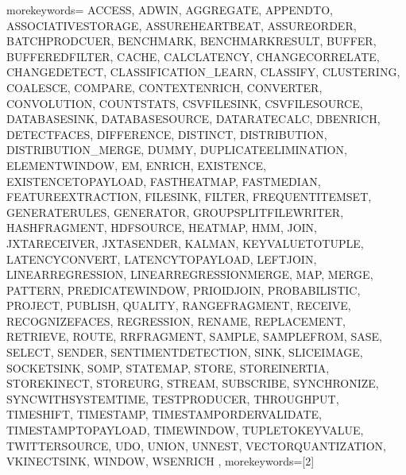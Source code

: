 
%
   {morekeywords={%
ACCESS, ADWIN, AGGREGATE, APPENDTO, ASSOCIATIVESTORAGE, ASSUREHEARTBEAT, ASSUREORDER, BATCHPRODCUER, BENCHMARK, BENCHMARKRESULT, BUFFER, BUFFEREDFILTER, CACHE, CALCLATENCY, CHANGECORRELATE, CHANGEDETECT, CLASSIFICATION_LEARN, CLASSIFY, CLUSTERING, COALESCE, COMPARE, CONTEXTENRICH, CONVERTER, CONVOLUTION, COUNTSTATS, CSVFILESINK, CSVFILESOURCE, DATABASESINK, DATABASESOURCE, DATARATECALC, DBENRICH, DETECTFACES, DIFFERENCE, DISTINCT, DISTRIBUTION, DISTRIBUTION_MERGE, DUMMY, DUPLICATEELIMINATION, ELEMENTWINDOW, EM, ENRICH, EXISTENCE, EXISTENCETOPAYLOAD, FASTHEATMAP, FASTMEDIAN, FEATUREEXTRACTION, FILESINK, FILTER, FREQUENTITEMSET, GENERATERULES, GENERATOR, GROUPSPLITFILEWRITER, HASHFRAGMENT, HDFSOURCE, HEATMAP, HMM, JOIN, JXTARECEIVER, JXTASENDER, KALMAN, KEYVALUETOTUPLE, LATENCYCONVERT, LATENCYTOPAYLOAD, LEFTJOIN, LINEARREGRESSION, LINEARREGRESSIONMERGE, MAP, MERGE, PATTERN, PREDICATEWINDOW, PRIOIDJOIN, PROBABILISTIC, PROJECT, PUBLISH, QUALITY, RANGEFRAGMENT, RECEIVE, RECOGNIZEFACES, REGRESSION, RENAME, REPLACEMENT, RETRIEVE, ROUTE, RRFRAGMENT, SAMPLE, SAMPLEFROM, SASE, SELECT, SENDER, SENTIMENTDETECTION, SINK, SLICEIMAGE, SOCKETSINK, SOMP, STATEMAP, STORE, STOREINERTIA, STOREKINECT, STOREURG, STREAM, SUBSCRIBE, SYNCHRONIZE, SYNCWITHSYSTEMTIME, TESTPRODUCER, THROUGHPUT, TIMESHIFT, TIMESTAMP, TIMESTAMPORDERVALIDATE, TIMESTAMPTOPAYLOAD, TIMEWINDOW, TUPLETOKEYVALUE, TWITTERSOURCE, UDO, UNION, UNNEST, VECTORQUANTIZATION, VKINECTSINK, WINDOW, WSENRICH%
      },%
   morekeywords=[2]{%
}}
